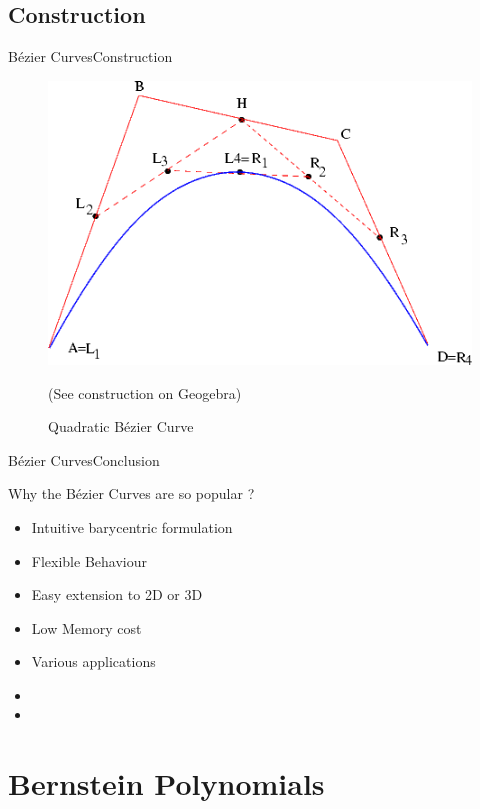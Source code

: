 \documentclass[10pt]{beamer}
\begin{document}
\subsection{Construction}
\begin{frame}{Bézier Curves}{Construction}
  
  \begin{figure}[H]
    \includegraphics[scale=0.5]{curve.png}
    \caption{Quadratic Bézier Curve}
    (See construction on Geogebra)
  \end{figure}
\end{frame}

  \begin{frame}{Bézier Curves}{Conclusion}

    Why the Bézier Curves are so popular ?
    \begin{itemize}
      \item Intuitive barycentric formulation
      \item Flexible Behaviour
      \item Easy extension to 2D or 3D
      \item Low Memory cost
      \item Various applications
      \item[]
      \item[]
    \end{itemize}
    
  \end{frame}


  \section{Bernstein Polynomials}
\end{document}
